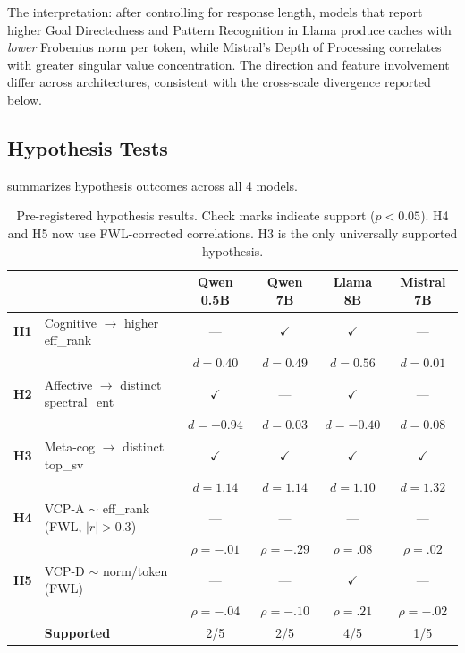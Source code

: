 \documentclass[11pt,a4paper]{article}
\begin{document}
The interpretation: after controlling for response length, models that report higher Goal Directedness and Pattern Recognition in Llama produce caches with \emph{lower} Frobenius norm per token, while Mistral's Depth of Processing correlates with greater singular value concentration. The direction and feature involvement differ across architectures, consistent with the cross-scale divergence reported below.

\subsection{Hypothesis Tests}

 summarizes hypothesis outcomes across all 4 models.

\begin{table}[H]
\centering
\caption{Pre-registered hypothesis results. Check marks indicate support ($p < 0.05$). H4 and H5 now use FWL-corrected correlations. H3 is the only universally supported hypothesis.}
\label{tab:hypotheses}
\begin{tabular}{llcccc}
\toprule
& & \textbf{Qwen 0.5B} & \textbf{Qwen 7B} & \textbf{Llama 8B} & \textbf{Mistral 7B} \\
\midrule
\textbf{H1} & Cognitive $\to$ higher eff\_rank         & ---              & $\checkmark$     & $\checkmark$     & ---              \\
             &                                          & $d{=}0.40$       & $d{=}0.49$       & $d{=}0.56$       & $d{=}0.01$       \\
\textbf{H2} & Affective $\to$ distinct spectral\_ent   & $\checkmark$     & ---              & $\checkmark$     & ---              \\
             &                                          & $d{=}{-}0.94$    & $d{=}0.03$       & $d{=}{-}0.40$    & $d{=}0.08$       \\
\textbf{H3} & Meta-cog $\to$ distinct top\_sv           & $\checkmark$     & $\checkmark$     & $\checkmark$     & $\checkmark$     \\
             &                                          & $d{=}1.14$       & $d{=}1.14$       & $d{=}1.10$       & $d{=}1.32$       \\
\textbf{H4} & VCP-A $\sim$ eff\_rank (FWL, $|r|{>}0.3$) & ---            & ---              & ---              & ---              \\
             &                                          & $\rho{=}{-}.01$  & $\rho{=}{-}.29$  & $\rho{=}.08$     & $\rho{=}.02$     \\
\textbf{H5} & VCP-D $\sim$ norm/token (FWL)             & ---             & ---              & $\checkmark$     & ---              \\
             &                                          & $\rho{=}{-}.04$  & $\rho{=}{-}.10$  & $\rho{=}.21$     & $\rho{=}{-}.02$  \\
\midrule
             & \textbf{Supported}                       & 2/5              & 2/5              & 4/5              & 1/5              \\
\bottomrule
\end{tabular}
\end{table}
\end{document}
